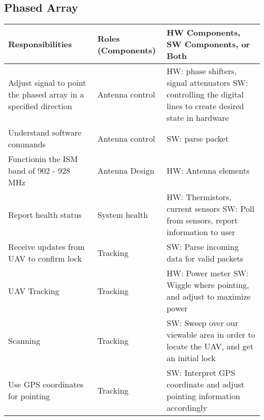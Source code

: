 \documentclass[RRC.tex]{subfiles}
\begin{document}
\bigskip

\subsection{\Large Phased Array}
\begin{center}
	\begin{tabular}{ | p{5cm} | p{5cm} | p{5cm} |}
		\hline
		Responsibilities & Roles (Components) & HW Components, SW Components, or Both \\ \hline	
		Adjust signal to point the phased array in a specified direction & Antenna control & HW: phase shifters, signal attenuators SW: controlling the digital lines to create desired state in hardware   \\ \hline
		Understand software commands & Antenna control & SW: parse packet  \\ \hline
		Functionin the ISM band of 902 - 928 MHz & Antenna Design & HW: Antenna elements \\ \hline
		Report health status & System health & HW: Thermistors, current sensors SW: Poll from sensors, report information to user \\ \hline
		Receive updates from UAV to confirm lock & Tracking & SW: Parse incoming data for valid packets \\ \hline
		UAV Tracking & Tracking & HW: Power meter SW: Wiggle where pointing, and adjust to maximize power \\ \hline
		Scanning & Tracking & SW: Sweep over our viewable area in order to locate the UAV, and get an initial lock \\ \hline
		Use GPS coordinates for pointing & Tracking & SW: Interpret GPS coordinate and adjust pointing information accordingly \\ \hline
		
		
		
	\end{tabular}
\end{center}
\end{document}
